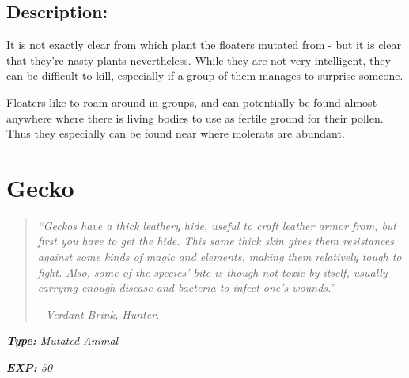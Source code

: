 \documentclass[11pt,a4paper,twocolumn]{book}
\begin{document}
	\subsection*{Description:}
	It is not exactly clear from which plant the floaters mutated from - but it is clear that they're nasty plants nevertheless. While they are not very intelligent, they can be difficult to kill, especially if a group of them manages to surprise someone. 
	
	Floaters like to roam around in groups, and can potentially be found almost anywhere where there is living bodies to use as fertile ground for their pollen. Thus they especially can be found near where molerats are abundant.
	
	\clearpage
	
	\section*{Gecko}
	\begin{quote}
		\emph{``Geckos have a thick leathery hide, useful to craft leather armor from, but first you have to get the hide. This same thick skin gives them resistances against some kinds of magic and elements, making them relatively tough to fight. Also, some of the species' bite is though not toxic by itself, usually carrying enough disease and bacteria to infect one's wounds.''}
		
		\emph{-	Verdant Brink, Hunter.}
	\end{quote}
	
	\noindent
	\emph{\textbf{Type: }Mutated Animal}
	
	\noindent
	\emph{\textbf{EXP:} 50}
	
%		
%	
%		
\end{document}
